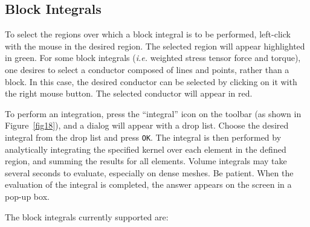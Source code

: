 \documentclass[12pt]{report}
\begin{document}
\subsection{Block Integrals}

To select the regions over which a block integral is to be performed,
left-click with the mouse in the desired region. The selected region will
appear highlighted in green. For some block integrals ({\em i.e.} weighted stress
tensor force and torque), one desires to select a conductor composed of
lines and points, rather than a block. In this case, the desired conductor
can be selected by clicking on it with the right mouse button. The selected
conductor will appear in red.

To perform an integration, press the ``integral'' icon on the
toolbar (as shown in Figure~\ref{fig18}), and a dialog will appear
with a drop list. Choose the desired integral from the drop list
and press \texttt{OK}. The integral is then performed by
analytically integrating the specified kernel over each element in
the defined region, and summing the results for all elements.
Volume integrals may take several seconds to evaluate, especially
on dense meshes. Be patient. When the evaluation of the integral is
completed, the answer appears on the screen in a pop-up box.





The block integrals currently supported are:
\end{document}
